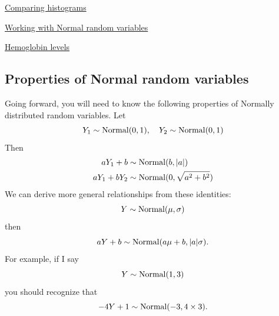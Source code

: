 \begin{exercise}
\href{https://colab.research.google.com/drive/1PPFwE4GUzsr707s3mPhGRs7-TYlHxND2#scrollTo=qDKKEAeJXm87&line=1&uniqifier=1}{Comparing histograms}
\end{exercise}






\begin{example}
\href{https://colab.research.google.com/drive/1PPFwE4GUzsr707s3mPhGRs7-TYlHxND2#scrollTo=V7XdPehJX2Q3&line=1&uniqifier=1}{Working with Normal random variables}
\end{example}


\begin{exercise}
\href{https://colab.research.google.com/drive/1PPFwE4GUzsr707s3mPhGRs7-TYlHxND2#scrollTo=wq-MSEh7YARC&line=1&uniqifier=1}{Hemoglobin levels}
\end{exercise}

\subsection{Properties of Normal random variables}
Going forward, you will need to know the following properties of Normally distributed random variables. Let
\begin{equation}
Y_1 \sim {\rm Normal}(0,1),\quad Y_2 \sim {\rm Normal}(0,1)
\end{equation}
 Then
\begin{align}
aY_1 + b &\sim {\rm Normal}(b,|a|)\\
aY_1 + bY_2 &\sim {\rm Normal}(0,\sqrt{a^2 + b^2})
\end{align}
We can derive more general relationships from these identities:
\begin{equation}
Y \sim {\rm Normal}(\mu,\sigma)
\end{equation}
then 
\begin{equation}
aY + b \sim {\rm Normal}(a\mu+b,|a|\sigma).
\end{equation}
For example, if I say 
\begin{equation}
Y \sim {\rm Normal}(1,3)
\end{equation}
you should recognize that 
\begin{equation}
-4Y + 1 \sim {\rm Normal}(-3,4\times 3).
\end{equation}

